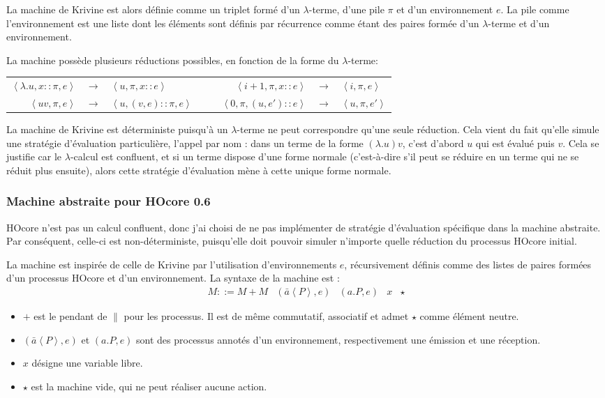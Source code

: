 \documentclass[11pt]{article}
\newcommand{\krivine}[1]{\left\langle{#1}\right\rangle}
\newcommand{\send}[2]{\bar{#1}\left\langle #2\right\rangle}
\newcounter{c_theo}
\newcounter{c_def}
\begin{document}
La machine de Krivine est alors définie comme un triplet formé d'un $\lambda$-terme, d'une pile $\pi$ et d'un environnement $e$.
La pile comme l'environnement est une liste dont les éléments sont définis par récurrence comme étant des paires formée d'un $\lambda$-terme et d'un environnement.

La machine possède plusieurs réductions possibles, en fonction de la forme du $\lambda$-terme:

\begin{tabular}{rclccrcl}
	$\krivine{\lambda.u,x::\pi,e}$ &$\to$& $\krivine{u,\pi,x::e}$ 
	& & & $\krivine{i+1,\pi,x::e}$ & $\to$ & $\krivine{i,\pi,e}$ \\
	$\krivine{u v,\pi,e}$ & $\to$ & $\krivine{u, (v,e)::\pi,e}$ 
	& & & $\krivine{0,\pi,(u,e')::e}$ & $\to$ & $\krivine{u,\pi,e'}$
\end{tabular}

\textit{}

La machine de Krivine est déterministe puisqu'à un $\lambda$-terme ne peut correspondre qu'une seule réduction.
Cela vient du fait qu'elle simule une stratégie d'évaluation particulière, l'appel par nom : dans un terme de la forme $(\lambda.u) v$, c'est d'abord $u$ qui est évalué puis $v$.
Cela se justifie car le $\lambda$-calcul est confluent, et si un terme dispose d'une forme normale (c'est-à-dire s'il peut se réduire en un terme qui ne se réduit plus ensuite), alors cette stratégie d'évaluation mène à cette unique forme normale.

\subsubsection{Machine abstraite pour HOcore 0.6}
\label{sec-3-1-2}

HOcore n'est pas un calcul confluent, donc j'ai choisi de ne pas implémenter de stratégie d'évaluation spécifique dans la machine abstraite.
Par conséquent, celle-ci est non-déterministe, puisqu'elle doit pouvoir simuler n'importe quelle réduction du processus HOcore initial.

La machine est inspirée de celle de Krivine par l'utilisation d'environnements $e$, récursivement définis comme des listes de paires formées d'un processus HOcore et d'un environnement. La syntaxe de la machine est :
\[\begin{array}{c|c|c|c|c}M::= M + M & (\send{a}P,e) & (a.P,e) & x & \star\end{array}\]
\begin{itemize}
	\item $+$ est le pendant de $\parallel$ pour les processus. Il est de même commutatif, associatif et admet $\star$ comme élément neutre.
	\item $(\send{a}P,e)$ et $(a.P,e)$ sont des processus annotés d'un environnement, respectivement une émission et une réception.
	\item $x$ désigne une variable libre.
	\item $\star$ est la machine vide, qui ne peut réaliser aucune action.
\end{itemize}
\end{document}
